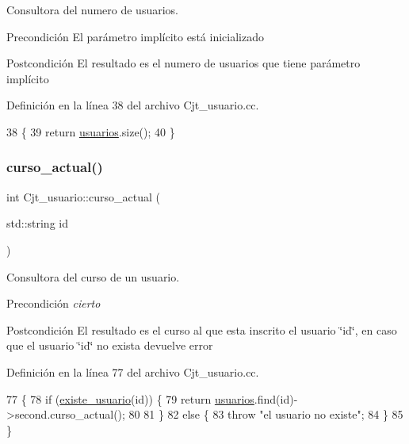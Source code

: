 Consultora del numero de usuarios. 

\begin{DoxyPrecond}{Precondición}
El parámetro implícito está inicializado 
\end{DoxyPrecond}
\begin{DoxyPostcond}{Postcondición}
El resultado es el numero de usuarios que tiene parámetro implícito 
\end{DoxyPostcond}


Definición en la línea 38 del archivo Cjt\+\_\+usuario.\+cc.


\begin{DoxyCode}
38                               \{
39     \textcolor{keywordflow}{return} \mbox{\hyperlink{class_cjt__usuario_af814d06f1c52bc2e744d253d20ce6e6b}{usuarios}}.size();
40 \}
\end{DoxyCode}
\mbox{\label{class_cjt__usuario_aa21aa736c5b2094fe5d21415f1761cfa}} 
\subsubsection{\texorpdfstring{curso\+\_\+actual()}{curso\_actual()}}
{\footnotesize\ttfamily int Cjt\+\_\+usuario\+::curso\+\_\+actual (\begin{DoxyParamCaption}\item[{std\+::string}]{id }\end{DoxyParamCaption})}



Consultora del curso de un usuario. 

\begin{DoxyPrecond}{Precondición}
{\itshape cierto} 
\end{DoxyPrecond}
\begin{DoxyPostcond}{Postcondición}
El resultado es el curso al que esta inscrito el usuario \char`\"{}id\char`\"{}, en caso que el usuario \char`\"{}id\char`\"{} no exista devuelve error 
\end{DoxyPostcond}


Definición en la línea 77 del archivo Cjt\+\_\+usuario.\+cc.


\begin{DoxyCode}
77                                        \{
78   \textcolor{keywordflow}{if} (\mbox{\hyperlink{class_cjt__usuario_a2d4478e6b967659040f5a0b86b665204}{existe\_usuario}}(\textcolor{keywordtype}{id})) \{
79     \textcolor{keywordflow}{return} \mbox{\hyperlink{class_cjt__usuario_af814d06f1c52bc2e744d253d20ce6e6b}{usuarios}}.find(\textcolor{keywordtype}{id})->second.curso\_actual();
80 
81   \}
82   \textcolor{keywordflow}{else} \{
83     \textcolor{keywordflow}{throw} \textcolor{stringliteral}{"el usuario no existe"};
84   \}
85 \}
\end{DoxyCode}
\mbox{\label{class_cjt__usuario_a2d4478e6b967659040f5a0b86b665204}} 
